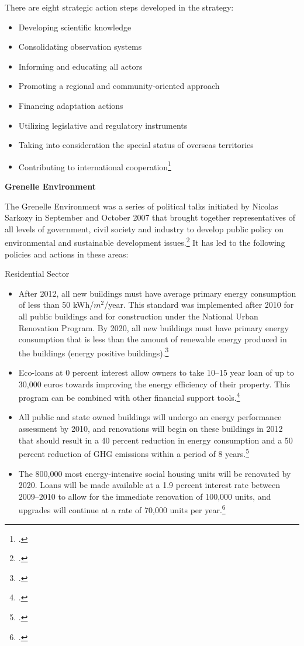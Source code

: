 \documentclass[10pt]{article}
\begin{document}
There are eight strategic action steps developed in the strategy:
\begin{itemize}
	\item Developing scientific knowledge
	\item Consolidating observation systems
	\item Informing and educating all actors
	\item Promoting a regional and community-oriented approach
	\item Financing adaptation actions
	\item Utilizing legislative and regulatory instruments
	\item Taking into consideration the special status of overseas territories
	\item Contributing to international cooperation\footcite[][]{SNAAC}
\end{itemize}



\textbf{Grenelle Environment}



The Grenelle Environment was a series of political talks initiated by Nicolas Sarkozy in September and October 2007 that brought together representatives of all levels of government, civil society and industry to develop public policy on environmental and sustainable development issues.\footcite[][]{GrenelleEnvironment}
It has led to the following policies and actions in these areas:


Residential Sector
\begin{itemize}
	\item After 2012, all new buildings must have average primary energy consumption of less than 50 kWh/$m^2$/year. This standard was implemented after 2010 for all public buildings and for construction under the National Urban Renovation Program. By 2020, all new buildings must have primary energy consumption that is less than the amount of renewable energy produced in the buildings (energy positive buildings).\footcite[][]{GrenellePolicies}
	\item Eco-loans at 0 percent interest allow owners to take 10--15 year loan of up to 30,000 euros towards improving the energy efficiency of their property. This program can be combined with other financial support tools.\footcite[][]{GrenellePolicies}
	\item All public and state owned buildings will undergo an energy performance assessment by 2010,  and renovations will begin on these buildings in 2012 that should result in a 40 percent reduction in energy consumption and a 50 percent reduction of GHG emissions within a period of 8 years.\footcite[][]{GrenellePolicies}
	\item The 800,000 most energy-intensive social housing units will be renovated by 2020. Loans will be made available at a 1.9 percent interest rate between 2009--2010 to allow for the immediate renovation of 100,000 units, and upgrades will continue at a rate of 70,000 units per year.\footcite[][]{GrenellePolicies}
\end{itemize}
\end{document}
